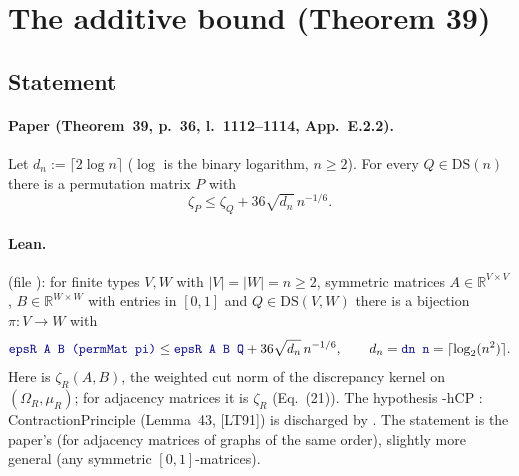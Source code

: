 \section{The additive bound (Theorem 39)}

\subsection{Statement}

\paragraph{Paper (Theorem~39, p.~36, l.~1112--1114, App.~E.2.2).} Let $d_n:=\lceil 2\log n\rceil$
($\log$ is the binary logarithm, $n\ge2$). For every $Q\in\mathrm{DS}(n)$ there is a permutation matrix $P$ with
\[ \zeta_P\le\zeta_Q+36\sqrt{d_n}\,n^{-1/6}. \]

\paragraph{Lean.}  (file ):
for finite types $V,W$ with $|V|=|W|=n\ge2$, symmetric matrices $A\in\mathbb R^{V\times V}$, $B\in\mathbb R^{W\times W}$
with entries in $[0,1]$ and $Q\in\mathrm{DS}(V,W)$ there is a bijection $\pi\colon V\to W$ with
\[ \lean{epsR A B (permMat pi)}\le\lean{epsR A B Q}+36\sqrt{d_n}\,n^{-1/6},\qquad d_n=\lean{dn n}=\lceil\log_2(n^2)\rceil. \]
Here  is $\zeta_R(A,B)$, the weighted cut norm of the discrepancy kernel on $(\Omega_R,\mu_R)$;
for adjacency matrices it is $\zeta_R$ (Eq.~(21)). The hypothesis \hyp{hCP : ContractionPrinciple} (Lemma~43,
[LT91]) is discharged by . The statement is the paper's (for adjacency matrices
of graphs of the same order), slightly more general (any symmetric $[0,1]$-matrices).

